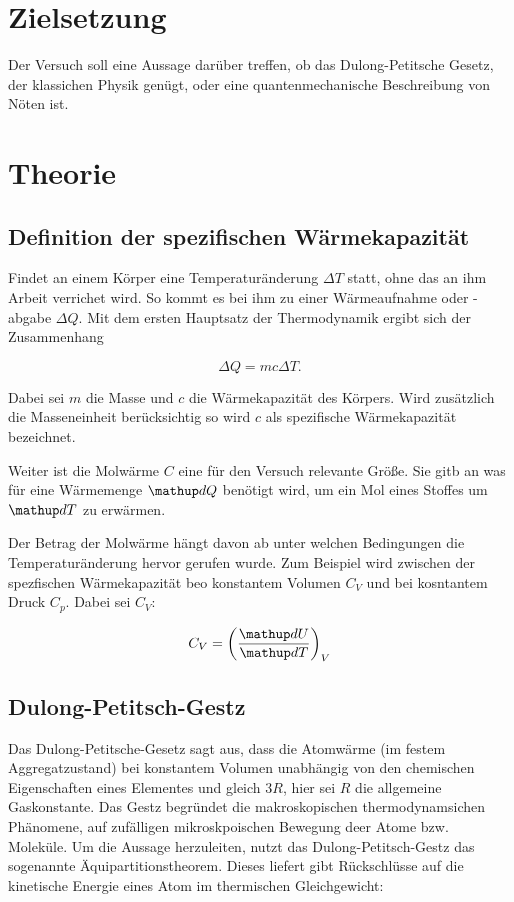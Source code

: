 \section*{Zielsetzung}
Der Versuch soll eine Aussage darüber treffen, ob das Dulong-Petitsche Gesetz, der klassichen Physik genügt, oder
eine quantenmechanische Beschreibung von Nöten ist.

\section{Theorie}

\subsection{Definition der spezifischen Wärmekapazität}

Findet an einem Körper eine Temperaturänderung $\Delta T$ statt, ohne das an ihm 
Arbeit verrichet wird. So kommt es bei ihm zu einer Wärmeaufnahme oder -abgabe $\Delta Q$.
Mit dem ersten Hauptsatz der Thermodynamik ergibt sich der Zusammenhang

\begin{equation*}
\Delta Q=m c \Delta T.
\end{equation*}

Dabei sei $m$ die Masse und $c$ die Wärmekapazität 
des Körpers.
Wird zusätzlich die Masseneinheit berücksichtig
so wird $c$ als spezifische Wärmekapazität bezeichnet.

Weiter ist die Molwärme $C$ eine für den Versuch relevante Größe.
Sie gitb an was für eine Wärmemenge $\map{d}Q$ benötigt wird,
um ein Mol eines Stoffes um $\map{d}T$ zu erwärmen.

Der Betrag der Molwärme hängt davon ab unter welchen Bedingungen 
die Temperaturänderung hervor gerufen wurde.
Zum Beispiel wird zwischen der spezfischen Wärmekapazität beo konstantem
Volumen $C_{V}$ und bei kosntantem Druck $C_{p}$.
Dabei sei $C_{V}$:

\begin{equation}
\label{eq:molwarme}
C_V=\left(\frac{\map{d}U}{\map{d}T}\right)_V
\end{equation}


\subsection{Dulong-Petitsch-Gestz}

Das Dulong-Petitsche-Gesetz sagt aus, dass die Atomwärme (im festem Aggregatzustand) bei 
konstantem Volumen unabhängig von den chemischen Eigenschaften eines Elementes 
und gleich $3R$, hier sei $R$ die allgemeine Gaskonstante.
Das Gestz begründet die makroskopischen thermodynamsichen Phänomene, 
auf zufälligen mikroskpoischen Bewegung deer Atome bzw. Moleküle.
Um die Aussage herzuleiten, nutzt das Dulong-Petitsch-Gestz
das sogenannte Äquipartitionstheorem. 
Dieses liefert gibt Rückschlüsse auf die kinetische Energie eines Atom
im thermischen Gleichgewicht:

